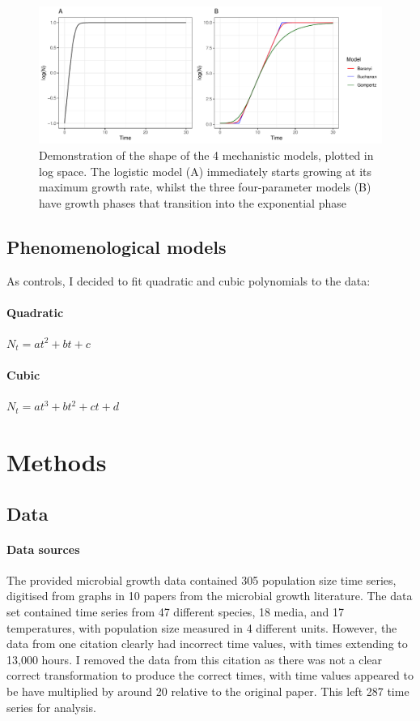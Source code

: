 \documentclass[11pt, a4paper]{article}
\begin{document}
\begin{linenumbers}
        \begin{figure}[h]
        \includegraphics[width=\linewidth]{../results/model_demo.pdf}
        \captionsetup{format=hang}
        \caption{Demonstration of the shape of the 4 mechanistic models, plotted in log space. The logistic model (A) immediately starts growing at its maximum growth rate, whilst the three four-parameter models (B) have growth phases that transition into the exponential phase}
        \label{fig:models_demo}
        \end{figure}

\subsection*{Phenomenological models}
As controls, I decided to fit quadratic and cubic polynomials to the data:
\paragraph*{Quadratic} $ N_t = at^2 + bt + c $
\paragraph*{Cubic} \quad \quad $ N_t = at^3 + bt^2 + ct + d $


   \section{Methods}
   
   \subsection{Data}
   
\paragraph{Data sources}
The provided microbial growth data contained 305 population size time series, digitised from graphs in 10 papers from the microbial growth literature. The data set contained time series from 47 different species, 18 media, and 17 temperatures, with population size measured in 4 different units. However, the data from one citation \cite{discarded} clearly had incorrect time values, with times extending to 13,000 hours. I removed the data from this citation as there was not a clear correct transformation to produce the correct times, with time values appeared to be have multiplied by around 20 relative to the original paper. This left 287 time series for analysis.


\end{linenumbers}
\end{document}
